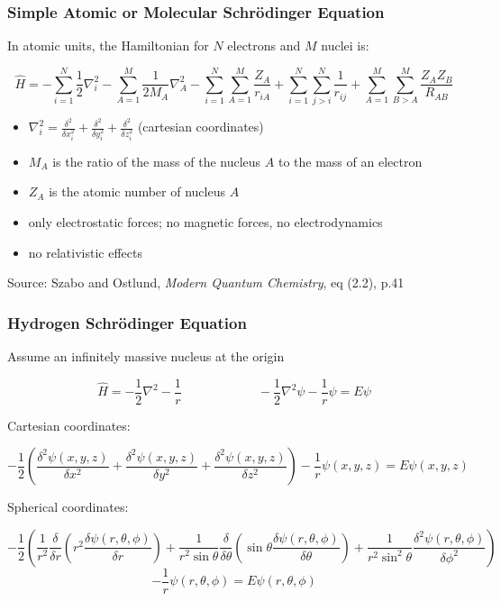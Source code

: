 \documentclass{beamer}
\begin{document}
\begin{frame}
\frametitle{Simple Atomic or Molecular Schr\"odinger Equation}

In atomic units, the Hamiltonian for $N$ electrons and $M$ nuclei is:

\[ \hat{H} = - \sum_{i=1}^N \frac{1}{2} \nabla_i^2 - \sum_{A=1}^M \frac{1}{2M_A}\nabla_A^2 - \sum_{i=1}^{N}\sum_{A=1}^M \frac{Z_A}{r_{iA}}
+ \sum_{i=1}^{N}\sum_{j>i}^N \frac{1}{r_{ij}} + \sum_{A=1}^{M}\sum_{B>A}^M \frac{Z_A Z_B}{R_{AB}}
 \]

\begin{itemize}
\item $ \nabla_i^2 = \frac{\delta^2}{\delta x_i^2} + \frac{\delta^2}{\delta y_i^2} + \frac{\delta^2}{\delta z_i^2}$ (cartesian coordinates)
\item $M_A$ is the ratio of the mass of the nucleus $A$ to the mass of an electron
\item $Z_A$ is the atomic number of nucleus $A$
\item only electrostatic forces; no magnetic forces, no electrodynamics
\item no relativistic effects
\end{itemize}

\vfill
Source: Szabo and Ostlund, {\it Modern Quantum Chemistry}, eq (2.2), p.41
\end{frame}

\begin{frame}
\frametitle{Hydrogen Schr\"odinger Equation}

\begin{center}

Assume an infinitely massive nucleus at the origin

\[ \hat{H} = - \frac{1}{2} \nabla^2 - \frac{1}{r}  \qquad\qquad\qquad - \frac{1}{2} \nabla^2 \psi - \frac{1}{r} \psi = E \psi \]

Cartesian coordinates:

{\small
\[ - \frac{1}{2} \left( \frac{\delta^2 \psi(x,y,z)}{\delta x^2} + \frac{\delta^2 \psi(x,y,z)}{\delta y^2} + \frac{\delta^2 \psi(x,y,z)}{\delta z^2} \right) - \frac{1}{r} \psi(x,y,z) = E \psi(x,y,z) \]
}

Spherical coordinates:

\scriptsize
\[ - \frac{1}{2} \left( \frac{1}{r^2} \frac{\delta}{\delta r}\left(r^2\frac{\delta \psi(r,\theta,\phi)}{\delta r}\right) + \frac{1}{r^2\sin\theta} \frac{\delta}{\delta \theta}\left(\sin\theta\frac{\delta \psi(r,\theta,\phi)}{\delta\theta}\right) + \frac{1}{r^2 \sin^2\theta}\frac{\delta^2 \psi(r,\theta,\phi)}{\delta \phi^2} \right) \]
\[ - \frac{1}{r} \psi(r,\theta,\phi) = E \psi(r,\theta,\phi) \]

\end{center}

\end{frame}
\end{document}
